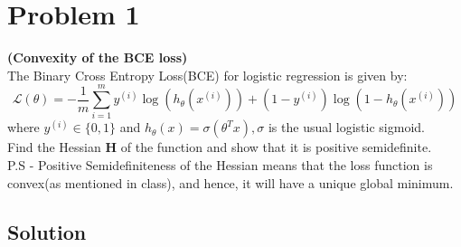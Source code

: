 \section*{Problem 1}

\textbf{(Convexity of the BCE loss)}\\
The Binary Cross Entropy Loss(BCE) for logistic regression is given by:
\[
    \mathcal{L}(\theta)=-\frac{1}{m} \sum_{i=1}^{m} y^{(i)} \log \left(h_{\theta}\left(x^{(i)}\right)\right)+\left(1-y^{(i)}\right) \log \left(1-h_{\theta}\left(x^{(i)}\right)\right)
\]
where \( y^{(i)} \in\{0,1\} \) and \( h_{\theta}(x)=\sigma\left(\theta^{T} x\right), \sigma \) is the usual logistic sigmoid.\\
Find the Hessian \( \mathbf{H} \) of the function and show that it is positive semidefinite.\\
P.S - Positive Semidefiniteness of the Hessian means that the loss function is convex(as mentioned in class), and hence, it will have a unique global minimum.

\subsection*{Solution}

